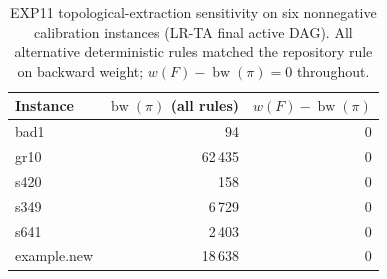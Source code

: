 \begin{table}[t]
\centering
\caption{EXP11 topological-extraction sensitivity on six nonnegative calibration instances (LR-TA final active DAG). All alternative deterministic rules matched the repository rule on backward weight; \(w(F)-\operatorname{bw}(\pi)=0\) throughout.}
\label{tab:exp11-extraction}
\begin{tabular}{lrr}
\toprule
Instance & \(\operatorname{bw}(\pi)\) (all rules) & \(w(F)-\operatorname{bw}(\pi)\) \\
\midrule
bad1 & 94 & 0 \\
gr10 & 62\,435 & 0 \\
s420 & 158 & 0 \\
s349 & 6\,729 & 0 \\
s641 & 2\,403 & 0 \\
example.new & 18\,638 & 0 \\
\bottomrule
\end{tabular}
\end{table}
